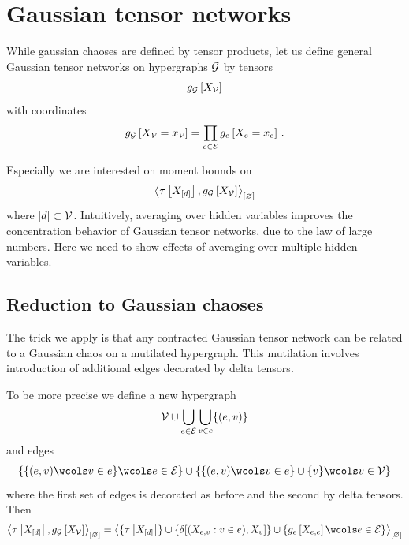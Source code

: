 \section{Gaussian tensor networks}

While gaussian chaoses are defined by tensor products, let us define general Gaussian tensor networks on hypergraphs $\mathcal{G}$ by tensors
\begin{align*}
    g_{\mathcal{G}}\left[X_{\mathcal{V}}\right]
\end{align*}
with coordinates
\begin{align*}
    g_{\mathcal{G}}\left[X_{\mathcal{V}}=x_{\mathcal{V}}\right]
    = \prod_{e\in\mathcal{E}}g_{e}\left[X_{e}=x_{e}\right] \, .
\end{align*}

Especially we are interested on moment bounds on
\begin{align*}
    \left\langle \tau\left[X_{[d]}\right],g_{\mathcal{G}}\left[X_{\mathcal{V}}\right]\right\rangle_{\left[ \varnothing \right]}
\end{align*}
where $[d]\subset\mathcal{V}$.
Intuitively, averaging over hidden variables improves the concentration behavior of Gaussian tensor networks, due to the law of large numbers.
Here we need to show effects of averaging over multiple hidden variables.

\subsection{Reduction to Gaussian chaoses}

The trick we apply is that any contracted Gaussian tensor network can be related to a Gaussian chaos on a mutilated hypergraph.
This mutilation involves introduction of additional edges decorated by delta tensors.

To be more precise we define a new hypergraph
\begin{align*}
    \mathcal{V} \cup \bigcup_{e\in\mathcal{E}}\bigcup_{v\in e} \{(e,v)\}
\end{align*}
and edges
\begin{align*}
    \{\{(\edge,\node) \wcols \node\in\edge\} \wcols \edgein \} %
    \cup \{\{(\edge,\node) \wcols \node\in\edge\}\cup\{\node\} \wcols \nodein \} %
\end{align*}
where the first set of edges is decorated as before and the second by delta tensors.
Then
\begin{align*}
    \contraction{\hypercorewith,\gausscoreofat{\graph}{\nodevariables}}
    = \contraction{\{\hypercorewith\}\cup\{\delta[(\catvariableof{\edge,\node}:\node\in\edge),\catvariableof{\node}]\}
        \cup \{\gausscoreofat{\edge}{\catvariableof{\edge,\edge}}\wcols\edgein\}
    }
\end{align*}


